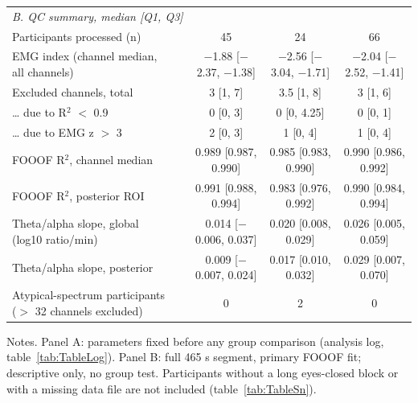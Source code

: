 \begin{table}[htbp]
{\begin{tabular}{p{3.2cm}p{6.5cm}ccc}
\midrule
\multicolumn{5}{l}{\textit{B. QC summary, median [Q1, Q3]}} \\
Participants processed (n) &  & 45 & 24 & 66 \\
EMG index (channel median, all channels) &  & $-$1.88 [$-$2.37, $-$1.38] & $-$2.56 [$-$3.04, $-$1.71] & $-$2.04 [$-$2.52, $-$1.41] \\
Excluded channels, total &  & 3 [1, 7] & 3.5 [1, 8] & 3 [1, 6] \\
\ldots{} due to R$^{2}$ $<$ 0.9 &  & 0 [0, 3] & 0 [0, 4.25] & 0 [0, 1] \\
\ldots{} due to EMG z $>$ 3 &  & 2 [0, 3] & 1 [0, 4] & 1 [0, 4] \\
FOOOF R$^{2}$, channel median &  & 0.989 [0.987, 0.990] & 0.985 [0.983, 0.990] & 0.990 [0.986, 0.992] \\
FOOOF R$^{2}$, posterior ROI &  & 0.991 [0.988, 0.994] & 0.983 [0.976, 0.992] & 0.990 [0.984, 0.994] \\
Theta/alpha slope, global (log10 ratio/min) &  & 0.014 [$-$0.006, 0.037] & 0.020 [0.008, 0.029] & 0.026 [0.005, 0.059] \\
Theta/alpha slope, posterior &  & 0.009 [$-$0.007, 0.024] & 0.017 [0.010, 0.032] & 0.029 [0.007, 0.070] \\
Atypical-spectrum participants ($>$ 32 channels excluded) &  & 0 & 2 & 0 \\
\bottomrule
\end{tabular}
}
\par\smallskip
\begin{minipage}{\textwidth}\raggedright\scriptsize
Notes. Panel A: parameters fixed before any group comparison (analysis log, table~\ref{tab:TableLog}). Panel B: full 465 s segment, primary FOOOF fit; descriptive only, no group test. Participants without a long eyes-closed block or with a missing data file are not included (table~\ref{tab:TableSn}).
\end{minipage}
\end{table}
